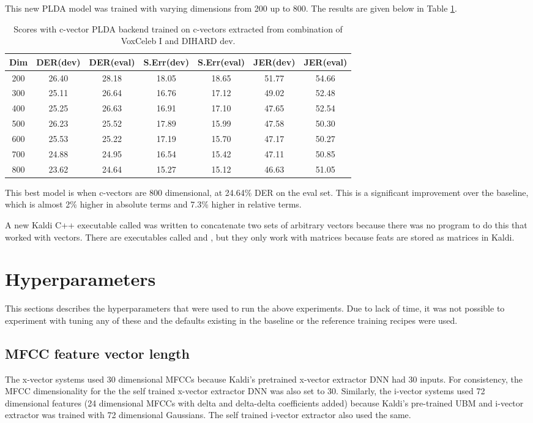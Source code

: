 	This new PLDA model was trained with varying dimensions from 200 up to 800. The results are given below in Table \ref{table-cvector}.
	\begin{table}[h]
		\centering
		\begin{tabular}{|c|c|c|c|c|c|c|}
			\hline
			Dim & DER(dev) & DER(eval) & S.Err(dev) & S.Err(eval) & JER(dev) & JER(eval) \\
			\hline
			200 & 26.40 & 28.18 & 18.05 & 18.65 & 51.77 & 54.66 \\
			300 & 25.11 & 26.64 & 16.76 & 17.12 & 49.02 & 52.48 \\
			400 & 25.25 & 26.63 & 16.91 & 17.10 & 47.65 & 52.54 \\
			500 & 26.23 & 25.52 & 17.89 & 15.99 & 47.58 & 50.30 \\
			600 & 25.53 & 25.22 & 17.19 & 15.70 & 47.17 & 50.27 \\
			700 & 24.88 & 24.95 & 16.54 & 15.42 & 47.11 & 50.85 \\
			800 & 23.62 & 24.64 & 15.27 & 15.12 & 46.63 & 51.05 \\
			\hline
		\end{tabular}
		\caption{Scores with c-vector PLDA backend trained on c-vectors extracted from combination of VoxCeleb I and DIHARD dev.}
		\label{table-cvector}
	\end{table}

	This best model is when c-vectors are 800 dimensional, at 24.64\% DER on the eval set. This is a significant improvement over the baseline, which is almost 2\% higher in absolute terms and 7.3\% higher in relative terms.
	
	A new Kaldi C++ executable called  was written to concatenate two sets of arbitrary vectors because there was no program to do this that worked with vectors. There are executables called  and , but they only work with matrices because feats are stored as matrices in Kaldi.
	
	\section{Hyperparameters}
		This sections describes the hyperparameters that were used to run the above experiments. Due to lack of time, it was not possible to experiment with tuning any of these and the defaults existing in the baseline or the reference training recipes were used.\\
		\subsection{MFCC feature vector length}
			The x-vector systems used 30 dimensional MFCCs because Kaldi's pretrained x-vector extractor DNN had 30 inputs. For consistency, the MFCC dimensionality for the the self trained x-vector extractor DNN was also set to 30.
			Similarly, the i-vector systems used 72 dimensional features (24 dimensional MFCCs with delta and delta-delta coefficients added) because Kaldi's pre-trained UBM and i-vector extractor was trained with 72 dimensional Gaussians. The self trained i-vector extractor also used the same.
